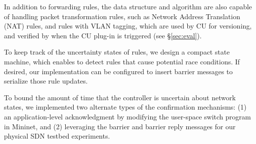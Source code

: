In addition to forwarding rules, 
the data structure and algorithm are also capable of handling packet transformation rules, 
such as Network Address Translation (NAT) rules, and rules with VLAN tagging, which are used by CU for versioning, and verified by \name when the CU plug-in is triggered (see \S\ref{sec:eval}).


To keep track of the uncertainty states of rules, we design a compact state machine, which enables \name to detect rules that cause potential race conditions. If desired, our implementation can be configured to insert barrier messages to serialize those rule updates.

To bound the amount of time that the controller is uncertain about network states, 
we implemented two alternate types of the confirmation mechanisms: (1) an application-level acknowledgment by
modifying the user-space switch program in Mininet, and (2) leveraging the
barrier and barrier reply messages for our physical SDN testbed experiments.

